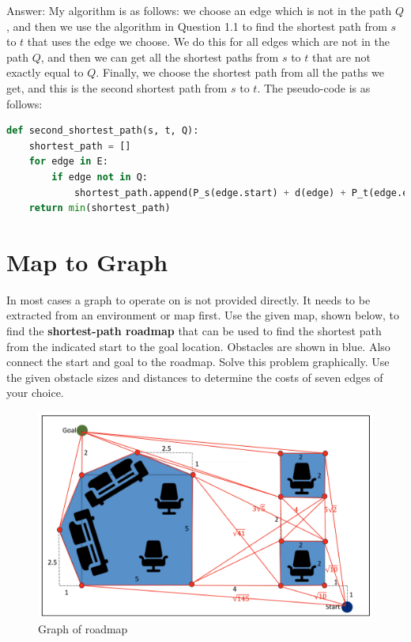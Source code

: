 \documentclass{article}
\begin{document}
        \noindent
        Answer: My algorithm is as follows: we choose an edge which is not in the path $Q$, and then we use the algorithm in Question 1.1 to find the shortest path from $s$ to $t$ that uses the edge we choose. We do this for all edges which are not in the path $Q$, and then we can get all the shortest paths from $s$ to $t$ that are not exactly equal to $Q$. Finally, we choose the shortest path from all the paths we get, and this is the second shortest path from $s$ to $t$. The pseudo-code is as follows:
        \newline

        \begin{lstlisting}[language=Python,title={Example code of the algorithm in Question 1.2}]
def second_shortest_path(s, t, Q):
    shortest_path = []
    for edge in E:
        if edge not in Q:
            shortest_path.append(P_s(edge.start) + d(edge) + P_t(edge.end))
    return min(shortest_path)
        \end{lstlisting}
    \newpage
    
    \section{Map to Graph}
    In most cases a graph to operate on is not provided directly. It needs to be extracted from an environment or map first. Use the given map, shown below, to find the \textbf{shortest-path roadmap} that can be used to find the shortest path from the indicated start to the goal location. Obstacles are shown in blue. Also connect the start and goal to the roadmap. Solve this problem graphically. Use the given obstacle sizes and distances to determine the costs of seven edges of your choice.

    \begin{figure}[H]
        \centering
        \includegraphics[width=1\linewidth]{img2.jpeg}
        \caption{Graph of roadmap}
        \label{2}
    \end{figure}
    \newpage
    
\end{document}
